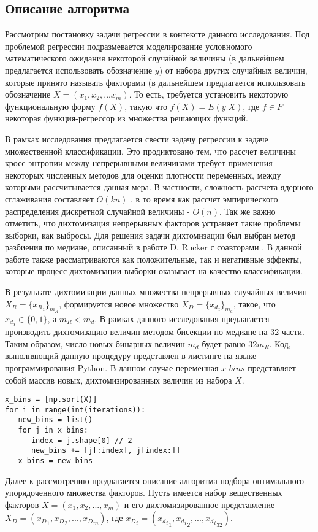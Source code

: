 \documentclass[runningheads]{llncs}
\begin{document}
\subsection{Описание алгоритма}
Рассмотрим постановку задачи регрессии в контексте данного исследования. Под проблемой регрессии подразмевается моделирование условномого математического ожидания некоторой случайной величины (в дальнейшем предлагается использовать обозначение $y$) от набора других случайных величин, которые принято называть факторами (в дальнейшем предлагается использовать обозначение $X = (x_1, x_2, ... x_m)$. То есть, требуется установить некоторую функциональную форму $f(X)$, такую что $f(X) = E(y|X)$, где $f \in F$ некоторая функция-регрессор из множества решающих функций.
\par
В рамках исследования предлагается свести задачу регрессии к задаче множественной классификации. Это продиктовано тем, что рассчет величины кросс-энтропии между непрерывными величинами требует применения некоторых численных методов для оценки плотности переменных, между которыми рассчитывается данная мера. В частности, сложность рассчета ядерного сглаживания составляет $O(kn)$ \cite{raykar2010fast}, в то время как рассчет эмпирического распределения дискретной случайной величины - $O(n)$. Так же важно отметить, что дихтомизация непрерывных факторов устраняет такие проблемы выборки, как выбросы. Для решения задачи дихтомизации был выбран метод разбиения по медиане, описанный в работе D. Rucker с соавторами \cite{maccallum2002practice}. В данной работе также рассматриваются как положительные, так и негативные эффекты, которые процесс дихтомизации выборки оказывает на качество классификации.
\par
В результате дихтомизации данных множества непрерывных случайных величин $X_R = \{{x_{R}}_i\}_{m_{R}}$, формируется новое множество $X_D = \{{x_{d}}_i\}_{m_{d}}$, такое, что ${x_{d}}_i \in \{0, 1\}$, а ${m_{R}} < {m_{d}}$. В рамках данного исследования предлагается производить дихтомизацию величин методом бисекции по медиане на 32 части. Таким образом, число новых бинарных величин ${m_{d}}$ будет равно $32{m_{R}}$. Код, выполняющий данную процедуру представлен в листинге на языке программирования Python. В данном случае переменная $x\_bins$ представляет собой массив новых, дихтомизированных величин из набора $X$.
\begin{lstlisting}
x_bins = [np.sort(X)]
for i in range(int(iterations)):
   new_bins = list()
   for j in x_bins:
      index = j.shape[0] // 2
      new_bins += [j[:index], j[index:]]
   x_bins = new_bins
\end{lstlisting}
\par
Далее к рассмотрению предлагается описание алгоритма подбора оптимального упорядоченного множества факторов. Пусть имеется набор вещественных факторов $X = (x_1, x_2, ..., x_m)$ и его дихтомизированное представление $X_D = ({x_D}_1, {x_D}_2, ..., {x_D}_m)$, где ${x_D}_i = ({{x_d}_i}_1, {{x_d}_i}_2, ..., {{x_d}_i}_{32})$. 
\end{document}
